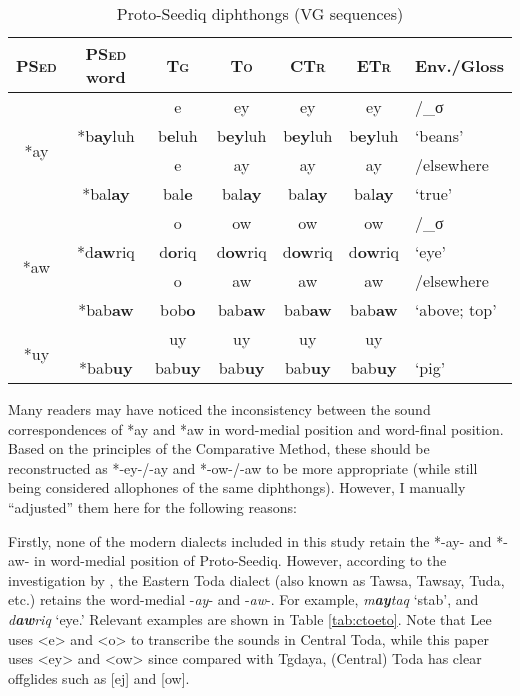 \documentclass[12pt]{article}
\newcommand{\psed}{\textsc{PSed}\xspace}
\newcommand{\psedf}{Proto-Seediq\xspace}
\newcommand{\stg}{\textsc{Tg}\xspace}
\newcommand{\stgf}{Tgdaya\xspace}
\newcommand{\sto}{\textsc{To}\xspace}
\newcommand{\sctr}{\textsc{CTr}\xspace}
\newcommand{\setr}{\textsc{ETr}\xspace}
\begin{document}
\begin{table}[!htbp]
\centering
\caption{Proto-Seediq diphthongs (VG sequences)}
\label{tab:sedVG}
\begin{tabular}{c|c|cccc|l}
\textbf{\psed} & \textbf{\psed word}      & \textbf{\stg} & \textbf{\sto} & \textbf{\sctr} & \textbf{\setr} & \multicolumn{1}{c}{\textbf{Env./Gloss}} \\ \hline
\multirow{4}{*}{*ay} & & e  & ey & ey & ey & /\_σ        \\ \cline{2-7}
                     & *b\textbf{ay}luh & b\textbf{e}luh & b\textbf{ey}luh & b\textbf{ey}luh & b\textbf{ey}luh & `beans' \\ \cline{2-7}
                     & & e  & ay & ay & ay & /elsewhere \\ \cline{2-7}
                     & *bal\textbf{ay} & bal\textbf{e} & bal\textbf{ay} & bal\textbf{ay} & bal\textbf{ay} & `true' \\ \hline
\multirow{4}{*}{*aw} & & o  & ow & ow & ow & /\_σ        \\ \cline{2-7}
                     & *d\textbf{aw}riq & d\textbf{o}riq & d\textbf{ow}riq & d\textbf{ow}riq & d\textbf{ow}riq & `eye' \\ \cline{2-7}
                     & & o  & aw & aw & aw & /elsewhere \\ \cline{2-7}
                     & *bab\textbf{aw} & bob\textbf{o} & bab\textbf{aw} & bab\textbf{aw} & bab\textbf{aw} & `above; top' \\ \hline 
\multirow{2}{*}{*uy} & & uy & uy & uy & uy &            \\ \cline{2-7}
                     & *bab\textbf{uy} & bab\textbf{uy} & bab\textbf{uy} & bab\textbf{uy} & bab\textbf{uy} & `pig' \\ \hline 
\end{tabular}
\end{table}

Many readers may have noticed the inconsistency between the sound correspondences of *ay and *aw in word-medial position and word-final position. Based on the principles of the Comparative Method, these should be reconstructed as *-ey-/-ay and *-ow-/-aw to be more appropriate (while still being considered allophones of the same diphthongs). However, I manually ``adjusted'' them here for the following reasons:

Firstly, none of the modern dialects included in this study retain the *-ay- and *-aw- in word-medial position of \psedf. However, according to the investigation by \textcite{lee2012tawsa}, the Eastern Toda dialect (also known as Tawsa, Tawsay, Tuda, etc.)  retains the word-medial -\textit{ay}- and -\textit{aw}-. For example, \textit{m\textbf{ay}taq} `stab', and \textit{d\textbf{aw}riq} `eye.' Relevant examples are shown in Table \ref{tab:ctoeto}. Note that Lee uses <e> and <o> to transcribe the sounds in Central Toda, while this paper uses <ey> and <ow> since compared with \stgf, (Central) Toda has clear offglides such as [ej] and [ow]. 
\end{document}

